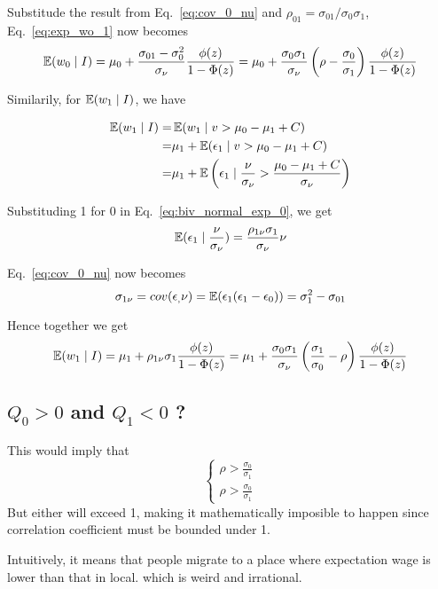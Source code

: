 Substitude the result from Eq.~\ref{eq:cov_0_nu} and $\rho_{01}=\sigma_{01}/\sigma_0\sigma_1$, 
Eq.~\ref{eq:exp_wo_1} now becomes
\begin{equation}
    \operatorname{\mathbb{E}}(w_{0} \mid I) = 
    \mu_0 + \frac{\sigma_{01}-\sigma_0^2}{\sigma_\nu} \frac{\phi(z)}{1-\Phi(z)}
    =\mu_0 + \frac{\sigma_0 \sigma_1}{\sigma_\nu}\left(
        \rho - \frac{\sigma_0}{\sigma_1}
    \right)\frac{\phi(z)}{1-\Phi(z)}
\end{equation}

Similarily, for $\operatorname{\mathbb{E}}(w_1 \mid I)$, we have

\begin{align*}
    \operatorname{\mathbb{E}}(w_{1} \mid I) =& \operatorname{\mathbb{E}}(w_{1} \mid v > \mu_0 - \mu_1 + C)  \\
    =& \mu_1 + \operatorname{\mathbb{E}}(\epsilon_1 \mid  v > \mu_0 - \mu_1 + C )  \\
    =& \mu_1 + \operatorname{\mathbb{E}} \left(
            \epsilon_1 \mid \frac{\nu}{\sigma_\nu} > \frac{\mu_0 - \mu_1 + C}{\sigma_\nu}
            \right)
\end{align*}

Substituding 1 for 0 in Eq.~\ref{eq:biv_normal_exp_0}, we get
\begin{equation}
    \label{eq:biv_normal_exp_1}
    \operatorname{\mathbb{E}}(\epsilon_1 \mid \frac{\nu}{\sigma_\nu})
    =\frac{\rho_{1\nu}\sigma_1}{\sigma_\nu}\nu
\end{equation}

Eq.~\ref{eq:cov_0_nu} now becomes
\begin{equation}
    \label{eq:cov_1_nu}
    \sigma_{1\nu}=cov(\epsilon_, \nu)=
    \operatorname{\mathbb{E}}(\epsilon_1 (\epsilon_1 - \epsilon_0)) = \sigma_{1}^2-\sigma_{01}
\end{equation}

Hence together we get
\begin{equation}
    \operatorname{\mathbb{E}}(w_{1} \mid I) = 
    \mu_1 + \rho_{1\nu}\sigma_1 \frac{\phi(z)}{1-\Phi(z)}
    =\mu_1 + \frac{\sigma_0 \sigma_1}{\sigma_\nu}\left(
        \frac{\sigma_1}{\sigma_0} - \rho
    \right)\frac{\phi(z)}{1-\Phi(z)}
\end{equation}

\subsection{$Q_0>0$ and $Q_1<0$ ?}

This would imply that
$$
\begin{cases}
    \rho>\frac{\sigma_0}{\sigma_1}\\
    \rho>\frac{\sigma_0}{\sigma_1}
\end{cases}
$$
But either will exceed 1, making it mathematically imposible to happen since correlation coefficient must be bounded under 1.

Intuitively, it means that people migrate to a place where expectation wage is lower than that in local.
which is weird and irrational.